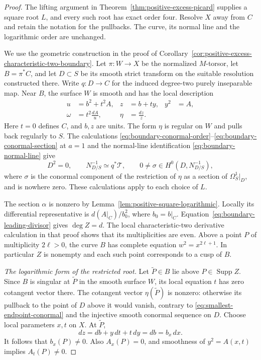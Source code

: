 \begin{proof}
The lifting argument in Theorem~\ref{thm:positive-excess-picard}
supplies a square root $L$, and every such root has exact order four.
Resolve $X$ away from $C$ and retain the notation for the pullbacks.
The curve, its normal line and the logarithmic order are unchanged.

We use the geometric construction in the proof of
Corollary~\ref{cor:positive-excess-characteristic-two-boundary}.
Let $\pi:W\to X$ be the normalized $M$-torsor, let $B=\pi^*C$,
and let $D\subset S$ be its smooth strict transform on the suitable
resolution constructed there.  Write $q:D\to C$ for the induced
degree-two purely inseparable map.  Near $B$, the surface $W$ is smooth
and has the local description
\begin{equation}\label{eq:smallest-endpoint-local-model}
 \begin{aligned}
 u&=b^2+t^2A,& z&=b+ty,& y^2&=A,\\
 \omega&=t^2\frac{dA}{u},& \eta&=\frac{dz}{z}.
 \end{aligned}
\end{equation}
Here $t=0$ defines $C$, and $b,z$ are units.  The form $\eta$ is
regular on $W$ and pulls back regularly to $S$.  The calculations
\eqref{eq:boundary-conormal-order}--\eqref{eq:boundary-conormal-section}
at $a=1$ and the normal-line identification
\eqref{eq:boundary-normal-line} give
\begin{equation}\label{eq:smallest-endpoint-conormal}
 D^2=0,\qquad N_{D/S}^{-1}\simeq q^*\mathcal T,
 \qquad
 0\ne\sigma\in H^0(D,N_{D/S}^{-1}),
\end{equation}
where $\sigma$ is the conormal component of the restriction of $\eta$
as a section of $\Omega_S^1|_D$, and is nowhere zero.
These calculations apply to each choice of $L$.

The section $\alpha$ is nonzero by
Lemma~\ref{lem:positive-square-logarithmic}.  Locally its differential
representative is $d(A|_C)/b_0^2$, where $b_0=b|_C$.
Equation~\eqref{eq:boundary-leading-divisor} gives $\deg Z=d$.
The local characteristic-two derivative calculation in that proof
shows that its multiplicities are even.  Above a point $P$ of
multiplicity $2\ell>0$, the curve $B$ has complete equation
$w^2=x^{2\ell+1}$.  In particular $Z$ is nonempty and each such point
corresponds to a cusp of $B$.

\smallskip\noindent
\emph{The logarithmic form of the restricted root.}
Let $\widetilde P\in B$ lie above $P\in\operatorname{Supp}Z$.
Since $B$ is singular at $\widetilde P$ in the smooth surface $W$,
its local equation $t$ has zero cotangent vector there.
The cotangent vector $\eta(\widetilde P)$ is nonzero: otherwise its
pullback to the point of $D$ above it would vanish, contrary to
\eqref{eq:smallest-endpoint-conormal} and the injective smooth
conormal sequence on $D$.
Choose local parameters $x,t$ on $X$.  At $\widetilde P$,
\[
 dz=db+y\,dt+t\,dy=db=b_x\,dx.
\]
It follows that $b_x(P)\ne0$.  Also $A_x(P)=0$, and smoothness of
$y^2=A(x,t)$ implies $A_t(P)\ne0$.


\end{proof}
